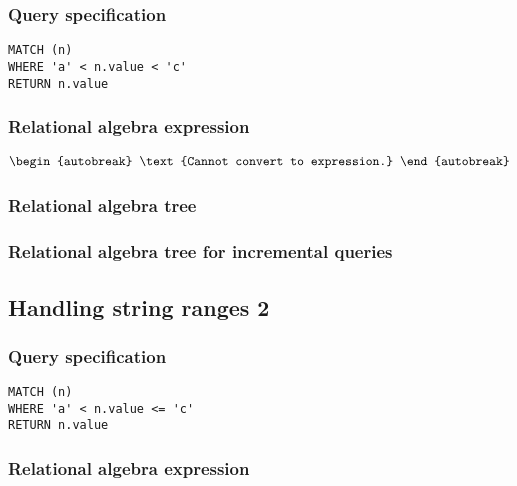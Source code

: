 \subsubsection*{Query specification}

\begin{lstlisting}
MATCH (n)
WHERE 'a' < n.value < 'c'
RETURN n.value
\end{lstlisting}

\subsubsection*{Relational algebra expression}

\begin{align*}
\begin{autobreak}
\text{Cannot convert to expression.}
\end{autobreak}
\end{align*}

\subsubsection*{Relational algebra tree}


\subsubsection*{Relational algebra tree for incremental queries}


\subsection{Handling string ranges 2}

\subsubsection*{Query specification}

\begin{lstlisting}
MATCH (n)
WHERE 'a' < n.value <= 'c'
RETURN n.value
\end{lstlisting}

\subsubsection*{Relational algebra expression}

